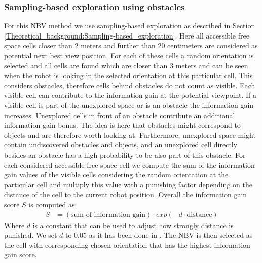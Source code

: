 \documentclass[a4paper,11pt,english]{article}
\begin{document}
\subsubsection{Sampling-based exploration using obstacles}
For this NBV method we use sampling-based exploration as described in Section \ref{Theoretical_background:Sampling-based_exploration}.
Here all accessible free space cells closer than $2$ meters and further than $20$ centimeters are considered as potential next best view position.
For each of these cells a random orientation is selected and all cells are found which are closer than $3$ meters and can be seen when the robot is looking in the selected orientation at this particular cell. This considers obstacles, therefore cells behind obstacles do not count as visible. %
Each visible cell can contribute to the information gain at the potential viewpoint.
If a visible cell is part of the unexplored space or is an obstacle the information gain increases. Unexplored cells in front of an obstacle contribute an additional information gain bonus.
The idea is here that obstacles might correspond to objects and are therefore worth looking at.
Furthermore, unexplored space might contain undiscovered obstacles and objects, and an unexplored cell directly besides an obstacle has a high probability to be also part of this obstacle.
For each considered accessible free space cell we compute the sum of the information gain values of the visible cells considering the random orientation at the particular cell and multiply this value with a punishing factor depending on the distance of the cell to the current robot position.
Overall the information gain score $S$ is computed as:
\begin{align*}
 S &= (\mbox{sum of information gain})\cdot exp(-d\cdot \mbox{distance})
\end{align*}
Where $d$ is a constant that can be used to adjust how strongly distance is punished. We set $d$ to $0.05$ as it has been done in \cite{surmann2003autonomous}.
The NBV is then selected as the cell with corresponding chosen orientation that has the highest information gain score.
\end{document}
